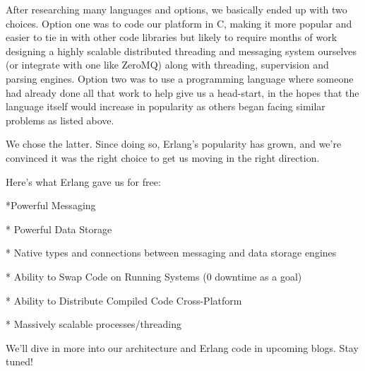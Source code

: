 After researching many languages and options, we basically ended up with two choices. Option one was to code our platform in C, making it more popular and easier to tie in with other code libraries but likely to require months of work designing a highly scalable distributed threading and messaging system ourselves (or integrate with one like ZeroMQ) along with threading, supervision and parsing engines. Option two was to use a programming language where someone had already done all that work to help give us a head-start, in the hopes that the language itself would increase in popularity as others began facing similar problems as listed above.

We chose the latter. Since doing so, Erlang’s popularity has grown, and we’re convinced it was the right choice to get us moving in the right direction. 

Here’s what Erlang gave us for free:

*Powerful Messaging

*   Powerful Data Storage

*   Native types and connections between messaging and data storage engines

*   Ability to Swap Code on Running Systems (0 downtime as a goal)

*   Ability to Distribute Compiled Code Cross-Platform

*   Massively scalable processes/threading

We’ll dive in more into our architecture and Erlang code in upcoming blogs. Stay tuned!

